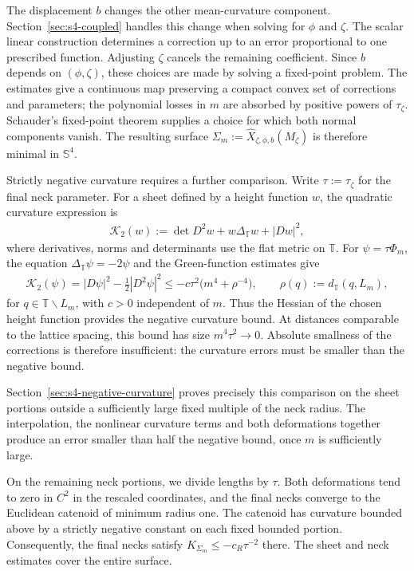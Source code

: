 \documentclass[a4paper,11pt,oneside,reqno]{amsart}
\numberwithin{equation}{section}
\theoremstyle{definition}
\begin{document}
The displacement $b$ changes the other mean-curvature
component. Section~\ref{sec:s4-coupled} handles this change when solving for $\phi$ and $\zeta$.
The scalar linear construction determines a
correction up to an error proportional to one
prescribed function. Adjusting $\zeta$ cancels
the remaining coefficient.
Since $b$ depends on $(\phi,\zeta)$, these choices
are made by solving a fixed-point problem.
The estimates give a continuous map preserving
a compact convex set of corrections and parameters;
the polynomial losses in $m$ are absorbed by
positive powers of $\tau_\zeta$.
Schauder's fixed-point theorem supplies a choice
for which both normal components vanish.
The resulting surface
$\Sigma_m:=\widehat X_{\zeta,\phi,b}(M_\zeta)$
is therefore minimal in $\mathbb S^4$.

Strictly negative curvature requires a further
comparison. Write $\tau:=\tau_\zeta$ for the final
neck parameter. For a sheet defined by a height
function $w$, the quadratic curvature expression is
%
\begin{align*}
    \mathcal K_2(w)
    :=\det D^2w+w\Delta_{\mathbb T}w+|Dw|^2,
\end{align*}
%
where derivatives, norms and determinants use the
flat metric on $\mathbb T$.
For $\psi=\tau\Phi_m$, the equation
$\Delta_{\mathbb T}\psi=-2\psi$ and the
Green-function estimates give
%
\begin{align*}
    \mathcal K_2(\psi)
    =|D\psi|^2-\frac12|D^2\psi|^2
    \leq-c\tau^2\bigl(m^4+\rho^{-4}\bigr),
    \qquad
    \rho(q):=d_{\mathbb T}(q,L_m),
\end{align*}
%
for $q\in\mathbb T\smallsetminus L_m$, with
$c>0$ independent of $m$.
Thus the Hessian of the chosen height function
provides the negative curvature bound.
At distances comparable to the lattice spacing,
this bound has size $m^4\tau^2\to0$.
Absolute smallness of the corrections is therefore
insufficient: the curvature errors must be smaller
than the negative bound.

Section~\ref{sec:s4-negative-curvature} proves
precisely this comparison on the sheet portions
outside a sufficiently large fixed multiple of
the neck radius. The interpolation, the nonlinear
curvature terms and both deformations together
produce an error smaller than half the negative
bound, once $m$ is sufficiently large.

On the remaining neck portions, we divide lengths
by $\tau$. Both deformations tend to zero in
$C^2$ in the rescaled coordinates, and the final
necks converge to the Euclidean catenoid of minimum
radius one. The catenoid has curvature bounded
above by a strictly negative constant on each
fixed bounded portion. Consequently, the final
necks satisfy $K_{\Sigma_m}\leq-c_R\tau^{-2}$
there. The sheet and neck estimates cover the
entire surface.
\end{document}
